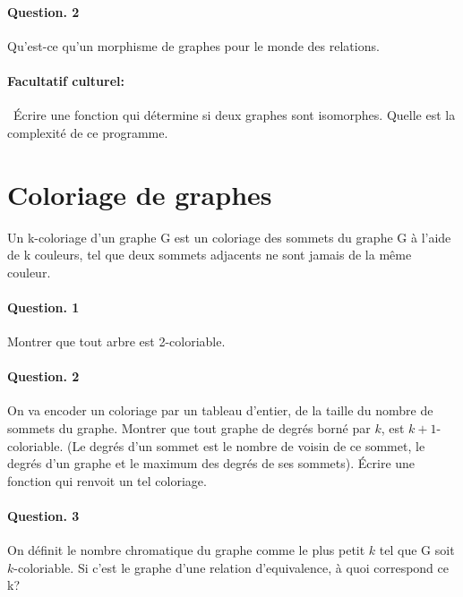 \documentclass[10pt,a4paper]{article}
\begin{document}
\paragraph{Question. 2\\}
Qu'est-ce qu'un morphisme de graphes pour le monde des relations. 

\paragraph{Facultatif culturel:\\} Écrire une fonction qui détermine si deux graphes
sont isomorphes. Quelle est la complexité de ce programme.

\section{Coloriage de graphes}

Un k-coloriage d'un graphe G est un coloriage des sommets du graphe G à
l'aide de k couleurs, tel que deux sommets adjacents ne sont jamais de la
même couleur.

\paragraph{Question. 1\\}
Montrer que tout arbre est 2-coloriable.

\paragraph{Question. 2\\}
On va encoder un coloriage par un tableau d'entier, de la taille du
nombre de sommets du graphe. Montrer que tout graphe de degrés borné par
$k$, est $k+1$-coloriable. (Le degrés d'un sommet est le nombre de voisin
de ce sommet, le degrés d'un graphe et le maximum des degrés de ses
sommets). Écrire une fonction qui renvoit un tel coloriage. 

\paragraph{Question. 3\\}
On définit le nombre chromatique du graphe comme le plus petit $k$ tel que
G soit $k$-coloriable. Si c'est le graphe d'une relation d'equivalence, à quoi
correspond ce k?
\end{document}
